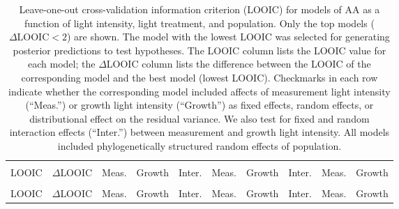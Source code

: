 \documentclass[
  letterpaper,
  DIV=11,
  numbers=noendperiod]{scrartcl}
\newcommand{\aax}{$\mathrm{AA}$}
\begin{document}
\begin{longtable}[t]{>{\centering\arraybackslash}p{0.7in}>{\centering\arraybackslash}p{0.5in}>{\centering\arraybackslash}p{0.4in}>{\centering\arraybackslash}p{0.4in}>{}c|>{\centering\arraybackslash}p{0.4in}>{\centering\arraybackslash}p{0.4in}>{}c|>{\centering\arraybackslash}p{0.4in}>{\centering\arraybackslash}p{0.4in}}

\caption{\label{tbl-aa_loo1}Leave-one-out cross-validation information
criterion (LOOIC) for models of \aax{} as a function of light intensity,
light treatment, and population. Only the top models
(\(\Delta \text{LOOIC} < 2\)) are shown. The model with the lowest LOOIC
was selected for generating posterior predictions to test hypotheses.
The LOOIC column lists the LOOIC value for each model; the
\(\Delta\)LOOIC column lists the difference between the LOOIC of the
corresponding model and the best model (lowest LOOIC). Checkmarks in
each row indicate whether the corresponding model included affects of
measurement light intensity (``Meas.'') or growth light intensity
(``Growth'') as fixed effects, random effects, or distributional effect
on the residual variance. We also test for fixed and random interaction
effects (``Inter.'') between measurement and growth light intensity. All
models included phylogenetically structured random effects of
population.}

\tabularnewline

\toprule
\multicolumn{2}{c}{ } & \multicolumn{3}{c}{Fixed} & \multicolumn{3}{c}{Random} & \multicolumn{2}{c}{Distributional} \\
\cmidrule(l{3pt}r{3pt}){3-5} \cmidrule(l{3pt}r{3pt}){6-8} \cmidrule(l{3pt}r{3pt}){9-10}
LOOIC & $\Delta$LOOIC & Meas. & Growth & Inter. & Meas. & Growth & Inter. & Meas. & Growth\\
\midrule
\endfirsthead
\multicolumn{10}{@{}l}{\textit{(continued)}}\\
\toprule
LOOIC & $\Delta$LOOIC & Meas. & Growth & Inter. & Meas. & Growth & Inter. & Meas. & Growth\\
\midrule
\endhead


\end{longtable}
\end{document}
